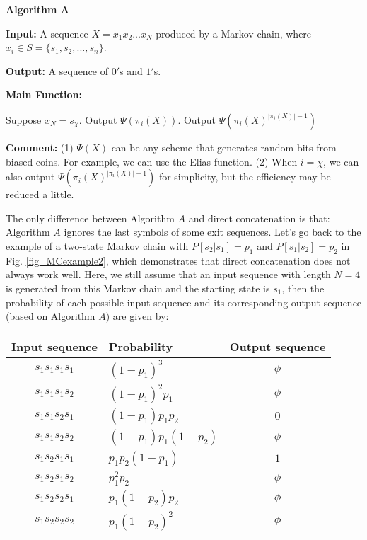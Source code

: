 \documentclass[journal]{IEEEtran}
\begin{document}
\begin{list}{}{\leftmargin=0.5em}
\renewcommand{\labelitemi}{}
  \item
  \item \textbf{Algorithm A}
  \item \textbf{Input:} A sequence $X=x_1x_2...x_N$ produced by a Markov chain, where $x_i\in S=\{s_1,s_2,...,s_n\}$.
  \item \textbf{Output:} A sequence of $0'$s and $1'$s.
  \item \textbf{Main Function:}
  \begin{algorithmic}
\STATE Suppose $x_N=s_\chi$.
        \STATE Output $\Psi(\pi_i(X))$.
    \ELSE
        \STATE Output $\Psi(\pi_i(X)^{|\pi_i(X)|-1})$
    \ENDIF
\ENDFOR
\end{algorithmic}
\item \textbf{Comment:} (1) $\Psi(X)$ can be any scheme that generates random bits from biased coins. For example, we can use the Elias function.
(2) When $i=\chi$, we can also output $\Psi(\pi_i(X)^{|\pi_i(X)|-1})$ for simplicity, but the efficiency may be reduced a little.
\item
\end{list}

The only difference between Algorithm $A$  and direct concatenation is that: Algorithm $A$ ignores the last symbols of some exit sequences. Let's go back to the example of a two-state Markov chain with $P[s_2|s_1]=p_1$ and $P[s_1|s_2]=p_2$ in Fig. \ref{fig_MCexample2}, which demonstrates that
direct concatenation does not always work well. Here, we still assume that an input sequence with length $N=4$ is generated from this Markov chain and the starting state is $s_1$, then
the probability of each possible input sequence and its corresponding output sequence (based on Algorithm $A$) are given by:

\vspace{0.5cm}
\begin{tabular}{|c|l|c|}
  \hline
\textrm{Input sequence}\quad & \textrm{Probability}\quad & \textrm{Output sequence}\\
\hline
  $s_1s_1s_1s_1$& $(1-p_1)^3$ & $\phi$\\
  $s_1s_1s_1s_2$& $(1-p_1)^2 p_1$ & $\phi$\\
  $s_1s_1s_2s_1$& $(1-p_1)p_1p_2$ & $0$\\
  $s_1s_1s_2s_2$& $(1-p_1)p_1(1-p_2)$ & $\phi$\\
  $s_1s_2s_1s_1$& $p_1p_2(1-p_1)$ & $1$\\
  $s_1s_2s_1s_2$& $p_1^2p_2$ & $\phi$\\
  $s_1s_2s_2s_1$& $p_1(1-p_2)p_2$ & $\phi$\\
  $s_1s_2s_2s_2$& $p_1(1-p_2)^2$ & $\phi$\\
  \hline
\end{tabular}
\vspace{0.5cm}
\end{document}
